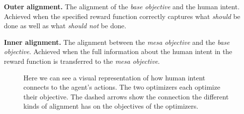 \documentclass[12pt,A4]{report}
\newcommand{\autobaj}{}
\theoremstyle{definition}
\begin{document}
\begin{displayquote} 
\textbf{Outer alignment.} 
The alignment of the \textit{base objective} and the human intent. Achieved when the specified reward function correctly captures what \textit{should} be done as well as what \textit{should not} be done.
\end{displayquote} 

\begin{displayquote} 
  \textbf{Inner alignment.} 
The alignment between the \textit{mesa objective} and the \textit{base objective}. Achieved when the full information about the human intent in the reward function is transferred to the \textit{mesa objective}.
\end{displayquote} 



\begin{figure}[H]
  
  \caption{Here we can see a visual representation of how human intent connects to the agent's actions. The two optimizers each optimize their objective. The dashed arrows show the connection the different kinds of alignment has on the objectives of the optimizers.}
  \label{fig:alignment}
\end{figure}





\end{document}
